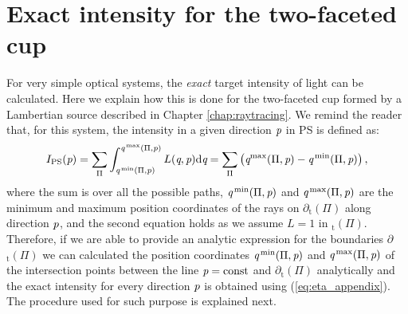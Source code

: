 \chapter{Exact intensity for the two-faceted cup}\label{app:boundariescup}
For very simple optical systems, the \textit{exact} target intensity of light can be calculated. Here we explain how this is done for the two-faceted cup formed by a Lambertian source described in Chapter \ref{chap:raytracing}. We remind the reader that, for this system, the intensity in a given direction $\textit{p}$ in PS is defined as:
\begin{equation}\label{eq:eta_appendix}
I_{\textrm{PS}}(\textit{p}) = \sum_{\Pi}\int_{\textit{q}^\textrm{\,min}(\Pi, \textit{p})}^{\textit{q}^\textrm{\,max}(\Pi,\textit{p})}L(\textit{q}, \textit{p})\textrm{d}\textit{q} = \sum_{\Pi}\big (\textit{q}^\textrm{max}(\Pi,\textit{p})-\textit{q}^\textrm{\,min}(\Pi,\textit{p})\big )\,,
\end{equation}
where the sum is over all the possible paths, $\textit{q}^\textrm{\,min}(\Pi,\textit{p})$ and $\textit{q}^\textrm{\,max}(\Pi,\textit{p})$ are the minimum and maximum position coordinates of the rays on $\partial$$_\textrm{t}(\Pi)$ along direction $\textit{p}$, and the second equation holds as we assume $L=1$ in $_\textrm{t}(\Pi)$.
Therefore, if we are able to provide an analytic expression for the boundaries $\partial$$_\textrm{t}(\Pi)$ we can calculated the position coordinates $\textit{q}^\textrm{\,min}(\Pi,\textit{p})$ and $\textit{q}^\textrm{\,max}(\Pi,\textit{p})$ of the intersection points between the line $\textit{p}=\textrm{const}$ and $\partial$$_\textrm{t}(\Pi)$ analytically and the exact intensity for every direction $\textit{p}$ is obtained using (\ref{eq:eta_appendix}). The procedure used for such purpose is explained next.
